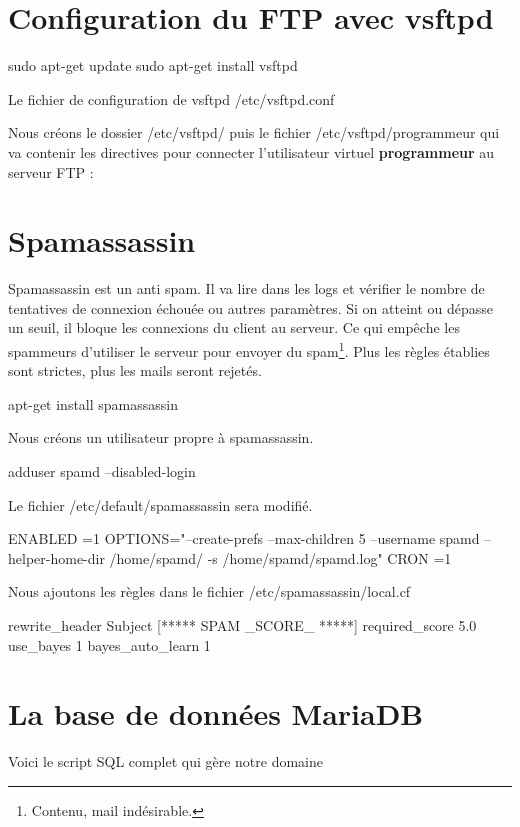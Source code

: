 \documentclass[a4paper,12pt,french]{report} %
\begin{document}
\section{Configuration du FTP  avec vsftpd}
\begin{exempleConsole}
sudo apt-get update
sudo apt-get install vsftpd
\end{exempleConsole}

Le fichier de configuration de vsftpd /etc/vsftpd.conf

Nous créons le dossier /etc/vsftpd/ puis le fichier /etc/vsftpd/programmeur qui va contenir les directives pour connecter l'utilisateur virtuel \textbf{programmeur} au serveur FTP :

\section{Spamassassin}
Spamassassin est un anti spam. Il va lire dans les logs et vérifier le nombre de tentatives de connexion échouée ou autres paramètres. Si on atteint ou dépasse un seuil, il bloque les connexions du client au serveur. Ce qui empêche les spammeurs d'utiliser le serveur pour envoyer du spam\footnote{Contenu, mail indésirable.}. Plus les règles établies sont strictes, plus les mails seront rejetés. 
\begin{exempleConsole}
apt-get install spamassassin
\end{exempleConsole}

Nous créons un utilisateur propre à spamassassin.
\begin{exempleConsole}
adduser spamd --disabled-login
\end{exempleConsole}

Le fichier /etc/default/spamassassin sera modifié.
\begin{exempleConsole}
ENABLED =1
OPTIONS="--create-prefs --max-children 5 --username spamd --helper-home-dir /home/spamd/ -s /home/spamd/spamd.log"
CRON =1
\end{exempleConsole}

Nous ajoutons les règles dans le fichier /etc/spamassassin/local.cf
\begin{exempleConsole}
rewrite_header Subject [***** SPAM _SCORE_ *****]
required_score 5.0
use_bayes 1
bayes_auto_learn 1
\end{exempleConsole}

\section{La base de données MariaDB}
Voici le script SQL complet qui gère notre domaine
\cesure
{}
\nocesure
\end{document}
